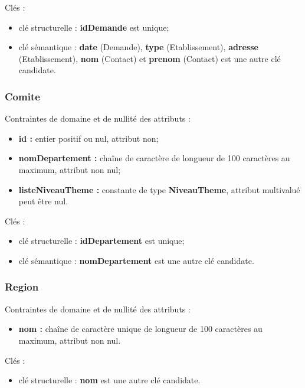 Clés : 
\begin{itemize}
\item clé structurelle : \textbf{idDemande} est unique;
\item clé sémantique : \textbf{date} (Demande), \textbf{type} (Etablissement), \textbf{adresse} (Etablissement), \textbf{nom} (Contact) et \textbf{prenom} (Contact) est une autre clé candidate. \\ 
\end{itemize}

\subsubsection*{Comite}
Contraintes de domaine et de nullité des attributs :
\begin{itemize}
	\item \textbf{id :} entier positif ou nul, attribut non;
	\item \textbf{nomDepartement :} chaîne de caractère de longueur de 100 caractères au maximum, attribut non nul;
	\item \textbf{listeNiveauTheme :} constante de type \textbf{NiveauTheme}, attribut multivalué peut être nul. \\
\end{itemize}

Clés : 
\begin{itemize}
\item clé structurelle : \textbf{idDepartement} est unique;
\item clé sémantique : \textbf{nomDepartement} est une autre clé candidate. \\ 
\end{itemize}

\subsubsection*{Region}
Contraintes de domaine et de nullité des attributs :
\begin{itemize}
	\item \textbf{nom :} chaîne de caractère unique de longueur de 100 caractères au maximum, attribut non nul.\\
\end{itemize}

Clés : 
\begin{itemize}
\item clé structurelle :  \textbf{nom} est une autre clé candidate. \\ 
\end{itemize}



